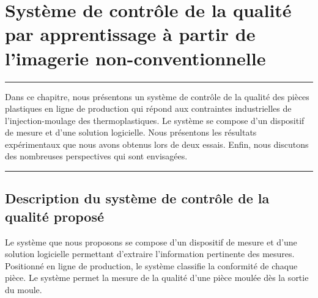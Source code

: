 
\lhead[\fancyplain{}{\leftmark}]%
      {\fancyplain{}{}} %
\chead[\fancyplain{}{}]%
      {\fancyplain{}{}}
\rhead[\fancyplain{}{}]%
      {\fancyplain{}{\rightmark}}%
\lfoot[\fancyplain{}{}]%
      {\fancyplain{}{}}
\cfoot[\fancyplain{}{\thepage}]%
      {\fancyplain{}{\thepage}} %
\rfoot[\fancyplain{}{}]%
     {\fancyplain{}{\scriptsize}}



\chapter{Système de contrôle de la qualité par apprentissage à partir de l’imagerie non-conventionnelle}
\label{ch:theeye}


\begin{center}
\rule{0.7\linewidth}{.5pt}
\begin{minipage}{0.7\linewidth}
\smallskip

	Dans ce chapitre, nous présentons un système de contrôle de la qualité des pièces plastiques en ligne de production qui répond aux contraintes industrielles de l'injection-moulage des thermoplastiques.
	Le système se compose d'un dispositif de mesure et d'une solution logicielle.
	Nous présentons les résultats expérimentaux que nous avons obtenus lors de deux essais.
	Enfin, nous discutons des nombreuses perspectives qui sont envisagées.

\end{minipage}
\smallskip
\rule{0.7\linewidth}{.5pt}
\end{center}

\minitoc
\newpage

\section{Description du système de contrôle de la qualité proposé} \label{sec:theeye_description}
Le système que nous proposons se compose d’un dispositif de mesure et d’une solution logicielle permettant d’extraire l’information pertinente des mesures.
Positionné en ligne de production, le système classifie la conformité de chaque pièce.
Le système permet la mesure de la qualité d’une pièce moulée dès la sortie du moule.

